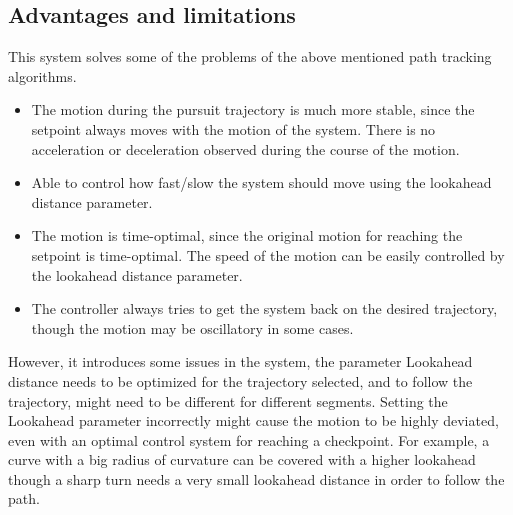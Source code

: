 \documentclass[hidelinks,BTech]{iitmdiss}
\begin{document}
\subsection{Advantages and limitations}
This system solves some of the problems of the above mentioned path tracking algorithms.
\begin{itemize}
	\item The motion during the pursuit trajectory is much more stable, since the setpoint always moves with the motion of the system. There is no acceleration or deceleration observed during the course of the motion.
	\item Able to control how fast/slow the system should move using the lookahead distance parameter. 
	\item The motion is time-optimal, since the original motion for reaching the setpoint is time-optimal. The speed of the motion can be easily controlled by the lookahead distance parameter.
	\item The controller always tries to get the system back on the desired trajectory, though the motion may be oscillatory in some cases. 
\end{itemize}


However, it introduces some issues in the system, the parameter Lookahead distance needs to be optimized for the trajectory selected, and to follow the trajectory, might need to be different for different segments. Setting the Lookahead parameter incorrectly might cause the motion to be highly deviated, even with an optimal control system for reaching a checkpoint. 
For example, a curve with a big radius of curvature can be covered with a higher lookahead though a sharp turn needs a very small lookahead distance in order to follow the path.
\end{document}
